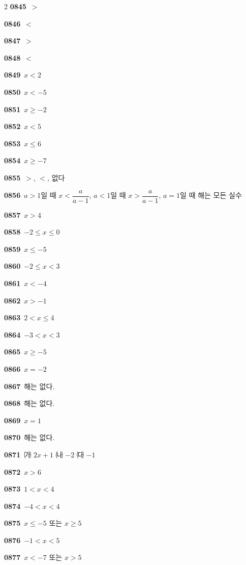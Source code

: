 \documentclass[10pt,a4paper]{article}
\begin{document}
\begin{multicols}{2}
\noindent\textbf{0845}\ $>$\par
\noindent\textbf{0846}\ $<$\par
\noindent\textbf{0847}\ $>$\par
\noindent\textbf{0848}\ $<$\par
\noindent\textbf{0849}\ $x<2$\par
\noindent\textbf{0850}\ $x<-5$\par
\noindent\textbf{0851}\ $x\ge -2$\par
\noindent\textbf{0852}\ $x<5$\par
\noindent\textbf{0853}\ $x\le 6$\par
\noindent\textbf{0854}\ $x\ge -7$\par
\noindent\textbf{0855}\ $>$, $<$, 없다\par
\noindent\textbf{0856}\ $a>1$일 때 $x<\dfrac{a}{a-1}$, $a<1$일 때 $x>\dfrac{a}{a-1}$, $a=1$일 때 해는 모든 실수\par
\noindent\textbf{0857}\ $x>4$\par
\noindent\textbf{0858}\ $-2\le x\le 0$\par
\noindent\textbf{0859}\ $x\le -5$\par
\noindent\textbf{0860}\ $-2\le x<3$\par
\noindent\textbf{0861}\ $x<-4$\par
\noindent\textbf{0862}\ $x>-1$\par
\noindent\textbf{0863}\ $2<x\le 4$\par
\noindent\textbf{0864}\ $-3<x<3$\par
\noindent\textbf{0865}\ $x\ge -5$\par
\noindent\textbf{0866}\ $x=-2$\par
\noindent\textbf{0867}\ 해는 없다.\par
\noindent\textbf{0868}\ 해는 없다.\par
\noindent\textbf{0869}\ $x=1$\par
\noindent\textbf{0870}\ 해는 없다.\par
\noindent\textbf{0871}\ ㈎ $2x+1$ ㈏ $-2$ ㈐ $-1$\par
\noindent\textbf{0872}\ $x>6$\par
\noindent\textbf{0873}\ $1<x<4$\par
\noindent\textbf{0874}\ $-4<x<4$\par
\noindent\textbf{0875}\ $x\le -5$ 또는 $x\ge 5$\par
\noindent\textbf{0876}\ $-1<x<5$\par
\noindent\textbf{0877}\ $x<-7$ 또는 $x>5$\par

\end{multicols}
\end{document}
